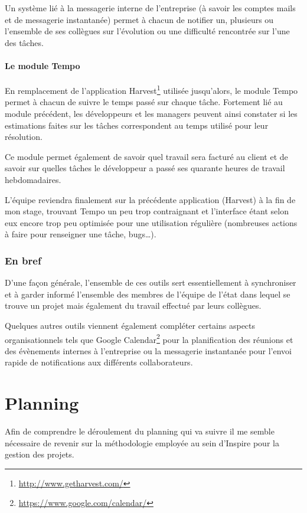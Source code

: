 \documentclass[12pt,a4paper]{book}
\begin{document}
Un système lié à la messagerie interne de l'entreprise (à savoir les comptes mails et de messagerie instantanée) permet à chacun de notifier un, plusieurs ou l'ensemble de ses collègues sur l'évolution ou une difficulté rencontrée sur l'une des tâches.

\subsubsection{Le module Tempo}

En remplacement de l'application Harvest\footnote{\url{http://www.getharvest.com/}} utilisée jusqu'alors, le module Tempo permet à chacun de suivre le temps passé sur chaque tâche. Fortement lié au module précédent, les développeurs et les managers peuvent ainsi constater si les estimations faites sur les tâches correspondent au temps utilisé pour leur résolution.

Ce module permet également de savoir quel travail sera facturé au client et de savoir sur quelles tâches le développeur a passé ses quarante heures de travail hebdomadaires.

L'équipe reviendra finalement sur la précédente application (Harvest) à la fin de mon stage, trouvant Tempo un peu trop contraignant et l'interface étant selon eux encore trop peu optimisée pour une utilisation régulière (nombreuses actions à faire pour renseigner une tâche, bugs…).

\subsection{En bref} 

D'une façon générale, l'ensemble de ces outils sert essentiellement à synchroniser et à garder informé l'ensemble des membres de l'équipe de l'état dans lequel se trouve un projet mais également du travail effectué par leurs collègues.

Quelques autres outils viennent également compléter certains aspects organisationnels tels que Google Calendar\footnote{\url{https://www.google.com/calendar/}} pour la planification des réunions et des évènements internes à l'entreprise ou la messagerie instantanée pour l'envoi rapide de notifications aux différents collaborateurs.

\chapter{Planning}

Afin de comprendre le déroulement du planning qui va suivre il me semble nécessaire de revenir sur la méthodologie employée au sein d'Inspire pour la gestion des projets.
\end{document}
